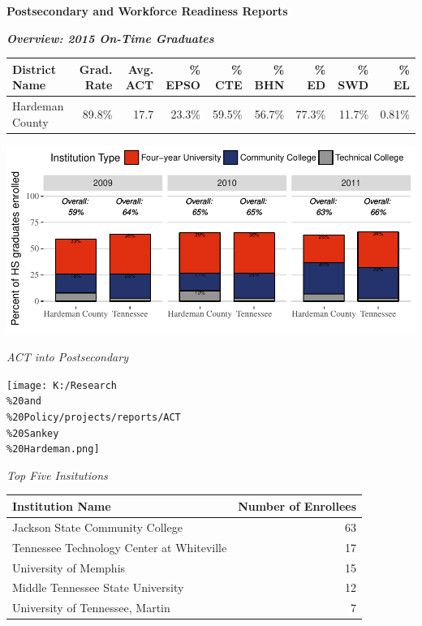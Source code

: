 \documentclass[11pt,]{article}
\title{}
\author{}
\date{}
\begin{document}
\begin{center}
\textbf{Postsecondary and Workforce Readiness Reports}
\textbf{}
  
\textbf{\textit{Overview: 2015 On-Time Graduates}}
\end{center}

\begin{longtable}[]{@{}lrrrrrrrr@{}}
\toprule
District Name & Grad. Rate & Avg. ACT & \% EPSO & \% CTE & \% BHN & \%
ED & \% SWD & \% EL\tabularnewline
\midrule
\endhead
Hardeman County & 89.8\% & 17.7 & 23.3\% & 59.5\% & 56.7\% & 77.3\% &
11.7\% & 0.81\%\tabularnewline
\bottomrule
\end{longtable}

\begin{center}\includegraphics{20170511_PSWRR_files/figure-latex/`District by Type P1`-1} \end{center}\begin{center}
\textit{ACT into Postsecondary}
\end{center}

\texttt{[image: K:/Research\\\%20and\\\%20Policy/projects/reports/ACT\\\%20Sankey\\\%20Hardeman.png]}

\begin{center}
\textit{Top Five Insitutions}
\end{center}

\begin{longtable}[]{@{}lr@{}}
\toprule
Institution Name & Number of Enrollees\tabularnewline
\midrule
\endhead
Jackson State Community College & 63\tabularnewline
Tennessee Technology Center at Whiteville & 17\tabularnewline
University of Memphis & 15\tabularnewline
Middle Tennessee State University & 12\tabularnewline
University of Tennessee, Martin & 7\tabularnewline
\bottomrule
\end{longtable}
\end{document}

